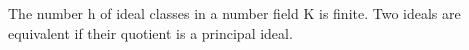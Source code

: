 The number h of ideal classes in a number field K is finite. Two ideals are equivalent if their quotient is a principal ideal.
